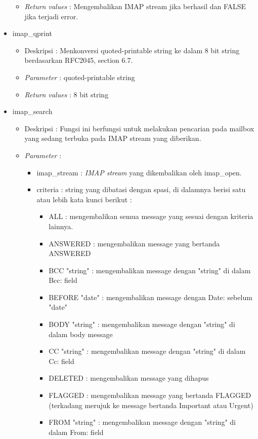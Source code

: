 \begin{itemize}
\begin{itemize}
\begin{itemize}
\end{itemize}
\item \textit{Return values} : Mengembalikan IMAP stream jika berhasil dan FALSE jika terjadi error.
\end{itemize}
 
\item imap\_qprint
\begin{itemize}
\item Deskripsi : Menkonversi quoted-printable string ke dalam 8 bit string berdasarkan RFC2045, section 6.7.
\item \textit{Parameter} : quoted-printable string
\item \textit{Return values} : 8 bit string
\end{itemize}
 
\item imap\_search
\begin{itemize}
\item Deskripsi : Fungsi ini berfungsi untuk melakukan pencarian pada mailbox yang sedang terbuka pada IMAP stream yang diberikan.
\item \textit{Parameter} :
\begin{itemize}
\item imap\_stream : \textit{IMAP stream} yang dikembalikan oleh imap\_open.
\item criteria : string yang dibatasi dengan spasi, di dalamnya berisi satu atau lebih kata kunci berikut : 
  \begin{itemize}
  \item ALL : mengembalikan semua message yang sesuai dengan kriteria lainnya.
  \item ANSWERED : mengembalikan message yang bertanda ANSWERED
  \item BCC "string" : mengembalikan message dengan "string" di dalam Bcc: field
  \item BEFORE "date" : mengembalikan message dengan Date: sebelum "date"
  \item BODY "string" : mengembalikan message dengan "string" di dalam body message
  \item CC "string" : mengembalikan message dengan "string" di dalam Cc: field
  \item DELETED : mengembalikan message yang dihapus
  \item FLAGGED : mengembalikan message yang bertanda FLAGGED (terkadang merujuk ke message bertanda Important atau Urgent)
  \item FROM "string" : mengembalikan message dengan "string" di dalam From: field

\end{itemize}
\end{itemize}
\end{itemize}
\end{itemize}
